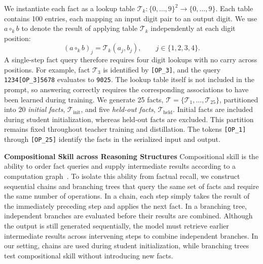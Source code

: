 \documentclass[]{template}
\theoremstyle{plain}
\theoremstyle{definition}
\theoremstyle{remark}
\renewcommand{\paragraph}[1]{\vspace{1mm}\noindent\textbf{#1}}
\begin{document}
We instantiate each fact as a lookup table $\mathcal{T}_k:\{0,\ldots,9\}^2\to\{0,\ldots,9\}$. Each table contains 100 entries, each mapping an input digit pair to an output digit. We use $a\circ_k b$ to denote the result of applying table $\mathcal{T}_k$ independently at each digit position:
\begin{equation}
    (a \circ_k b)_j = \mathcal{T}_k(a_j, b_j), \qquad j\in\{1,2,3,4\}.
    \label{eq:digitwise_operation}
\end{equation}
A single-step fact query therefore requires four digit lookups with no carry across positions. For example, fact $\mathcal{T}_3$ is identified  by \texttt{[OP\_3]}, and the query \texttt{1234[OP\_3]5678} evaluates to \texttt{9025}. The lookup table itself is not included in the prompt, so answering correctly requires the corresponding associations to have been learned during training. We generate 25 facts, $\mathcal{T}=\{\mathcal{T}_1,\ldots,\mathcal{T}_{25}\}$, partitioned into 20 \emph{initial facts}, $\mathcal{T}_{\mathrm{init}}$, and five \emph{held-out facts}, $\mathcal{T}_{\mathrm{held}}$. Initial facts are included during student initialization, whereas held-out facts are excluded. This partition remains fixed throughout teacher training and distillation. The tokens \texttt{[OP\_1]} through \texttt{[OP\_25]} identify the facts in the serialized input and output.


\paragraph{Compositional Skill across Reasoning Structures}
Compositional skill is the ability to order fact queries and supply intermediate results according to a computation graph~\citep{newell1972human,yuan2026f}. To isolate this ability from factual recall, we construct sequential chains and branching trees that query the same set of facts and require the same number of operations. In a chain, each step simply takes the result of the immediately preceding step and applies the next fact. %
In a branching tree, independent branches are evaluated before their results are combined. Although the output is still generated sequentially, the model must retrieve earlier intermediate results across intervening steps to combine independent branches. In our setting, chains are used during student initialization, while branching trees test compositional skill without introducing new facts.
\end{document}
